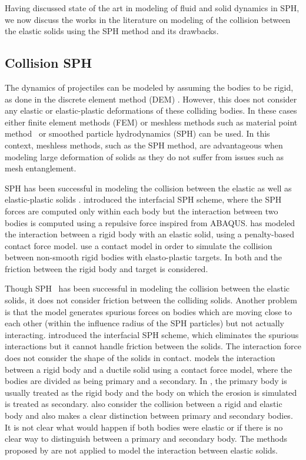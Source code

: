 Having discussed state of the art in modeling of fluid and solid dynamics in
SPH, we now discuss the works in the literature on modeling of the collision
between the elastic solids using the SPH method and its drawbacks.


\subsection{Collision SPH}
The dynamics of projectiles can be modeled by assuming the bodies to be
rigid, as done in the discrete element method (DEM) \citep{zhan2021surface}.
However, this does not consider any elastic or elastic-plastic deformations of
these colliding bodies. In these cases either finite element methods (FEM)
\citep{rodrigues2019elastic} or meshless methods such as material point
method~\citep{sulsky1994particle} or smoothed particle hydrodynamics (SPH)
\citep{gingold1977smoothed} can be used. In this context, meshless methods, such
as the SPH method, are advantageous when modeling large deformation of solids as
they do not suffer from issues such as mesh entanglement.

SPH has been successful in modeling the collision between the elastic as well as
elastic-plastic solids \citep{gray2001sph, cleary2010elastoplastic}.
\cite{yan2021simulation} introduced the interfacial SPH scheme, where the SPH
forces are computed only within each body but the interaction between two bodies
is computed using a repulsive force inspired from ABAQUS.
\cite{vyas2021collisional} has modeled the interaction between a rigid body with
an elastic solid, using a penalty-based contact force model.
\cite{mohseni2021particle} use a contact model in order to simulate the
collision between non-smooth rigid bodies with elasto-plastic targets. In both
\citep{vyas2021collisional} and \citep{mohseni2021particle} the friction between
the rigid body and target is considered.


Though SPH~\citep{gray2001sph} has been successful in modeling the collision
between the elastic solids, it does not consider friction between the colliding
solids. Another problem is that the model generates spurious forces on bodies
which are moving close to each other (within the influence radius of the SPH
particles) but not actually interacting. \cite{yan2021simulation} introduced the
interfacial SPH scheme, which eliminates the spurious interactions but it cannot
handle friction between the solids. The interaction force does not consider the
shape of the solids in contact. \cite{mohseni2021particle} models the
interaction between a rigid body and a ductile solid using a contact force
model, where the bodies are divided as being primary and a secondary. In
\citep{mohseni2021particle}, the primary body is usually treated as the rigid
body and the body on which the erosion is simulated is treated as secondary.
\cite{vyas2021collisional} also consider the collision between a rigid and
elastic body and also makes a clear distinction between primary and secondary
bodies. It is not clear what would happen if both bodies were elastic or if
there is no clear way to distinguish between a primary and secondary body. The
methods proposed by \cite{vyas2021collisional,mohseni2021particle} are not
applied to model the interaction between elastic solids.

